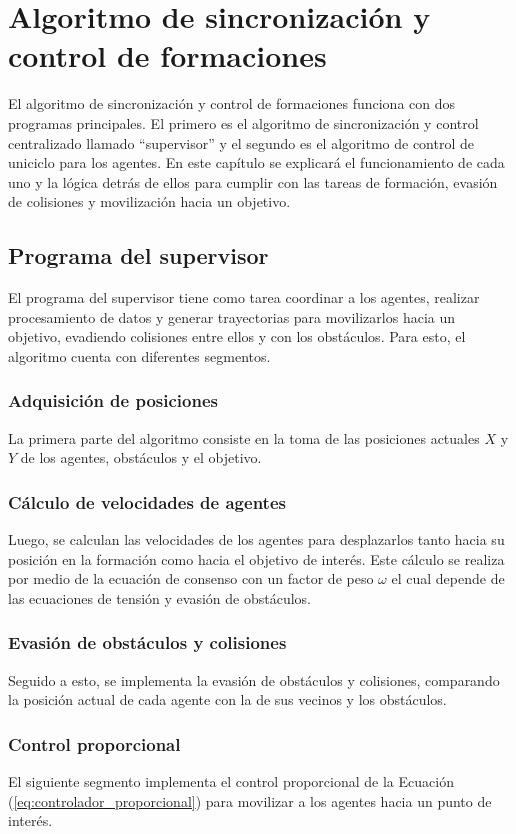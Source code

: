 \chapter{Algoritmo de sincronización y control de formaciones}\label{cap:algoritmo}
El algoritmo de sincronización y control de formaciones funciona con dos programas principales. El primero es el algoritmo de sincronización y control centralizado llamado ``supervisor'' y el segundo es el algoritmo de control de uniciclo para los agentes. En este capítulo se explicará el funcionamiento de cada uno y la lógica detrás de ellos para cumplir con las tareas de formación, evasión de colisiones y movilización hacia un objetivo.

\section{Programa del supervisor}
El programa del supervisor tiene como tarea coordinar a los agentes, realizar procesamiento de datos y generar trayectorias para movilizarlos hacia un objetivo, evadiendo colisiones entre ellos y con los obstáculos. Para esto, el algoritmo cuenta con diferentes segmentos.

\subsection{Adquisición de posiciones}
La primera parte del algoritmo consiste en la toma de las posiciones actuales $X$ y $Y$ de los agentes, obstáculos y el objetivo. 

\subsection{Cálculo de velocidades de agentes}
Luego, se calculan las velocidades de los agentes para desplazarlos tanto hacia su posición en la formación como hacia el objetivo de interés. Este cálculo se realiza por medio de la ecuación de consenso con un factor de peso $\omega$ el cual depende de las ecuaciones de tensión y evasión de obstáculos. 

\subsection{Evasión de obstáculos y colisiones}
Seguido a esto, se implementa la evasión de obstáculos y colisiones, comparando la posición actual de cada agente con la de sus vecinos y los obstáculos.

\subsection{Control proporcional}
El siguiente segmento implementa el control proporcional de la Ecuación (\ref{eq:controlador_proporcional}) para movilizar a los agentes hacia un punto de interés.

